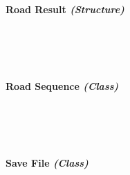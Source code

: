 \begin{FlushLeft}
\begin{enumerate}
    \bk

    \paragraph*{Road Result \textit{(Structure)}} \mbox{} \\

    \begin{figure}[H]
        \centering
    \end{figure}\\

    \bk

    \paragraph*{Road Sequence \textit{(Class)}} \mbox{} \\

    \begin{figure}[H]
        \centering
    \end{figure}\\

    \bk

    
    \paragraph*{Save File \textit{(Class)}} \mbox{} \\


\end{enumerate}
\end{FlushLeft}
